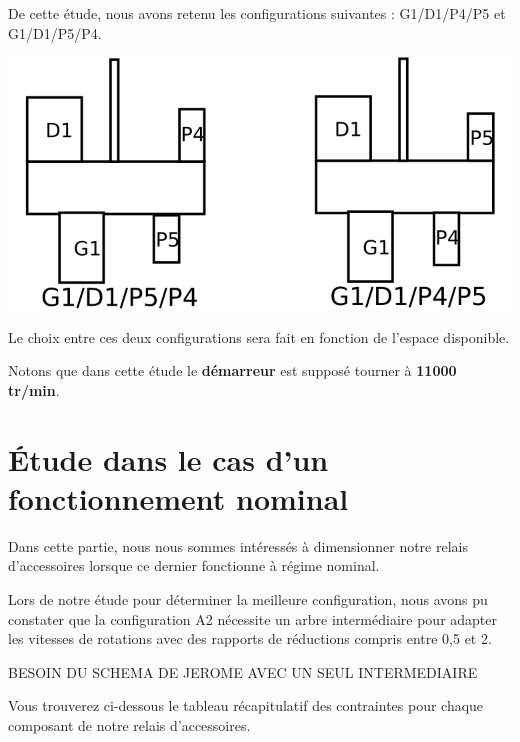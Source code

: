 \documentclass{config}
\begin{document}
\begin{spacing}{1.2}
De cette étude, nous avons retenu les configurations suivantes : G1/D1/P4/P5 et G1/D1/P5/P4.

\newpage
\begin{center}
\includegraphics[width=\textwidth]{conf_retenu.png}
\end{center}

Le choix entre ces deux configurations sera fait en fonction de l'espace disponible.

Notons que dans cette étude le \textbf{démarreur} est supposé tourner à \textbf{11000 tr/min}.

\newpage
\section{Étude dans le cas d'un fonctionnement nominal}

Dans cette partie, nous nous sommes intéressés à dimensionner notre relais d'accessoires lorsque ce dernier fonctionne à régime nominal. 

Lors de notre étude pour déterminer la meilleure configuration, nous avons pu constater que la configuration A2 nécessite un arbre intermédiaire pour adapter les vitesses de rotations avec des rapports de réductions compris entre  0,5 et 2.

BESOIN DU SCHEMA DE JEROME AVEC UN SEUL INTERMEDIAIRE

Vous trouverez ci-dessous le tableau récapitulatif des contraintes pour chaque composant de notre relais d'accessoires.


\end{spacing}
\end{document}
